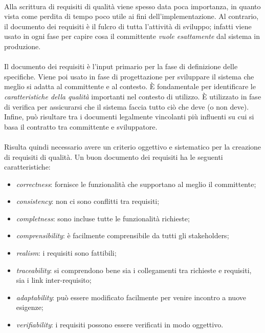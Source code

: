 \documentclass[11pt,a4paper,english]{article}
\begin{document}
\paragraph{} Alla scrittura di requisiti di qualità viene spesso data poca importanza, in quanto vista come perdita di tempo poco utile ai fini dell'implementazione. Al contrario, il documento dei requisiti è il fulcro di tutta l'attività di sviluppo; infatti viene usato in ogni fase per capire cosa il committente \emph{vuole esattamente} dal sistema in produzione. 

\paragraph{} Il documento dei requisiti è l'input primario per la fase di definizione delle specifiche. Viene poi usato in fase di progettazione per sviluppare il sistema che meglio si adatta al committente e al contesto. È fondamentale per identificare le \emph{caratteristiche della qualità} importanti nel contesto di utilizzo. È utilizzato in fase di verifica per assicurarsi che il sistema faccia tutto ciò che deve (o non deve). Infine, può risultare tra i documenti legalmente vincolanti più influenti su cui si basa il contratto tra committente e sviluppatore. 

\paragraph{} Risulta quindi necessario avere un criterio oggettivo e sistematico per la creazione di requisiti di qualità. Un buon documento dei requisiti ha le seguenti caratteristiche:
\begin{itemize}
    \item \emph{correctness}: fornisce le funzionalità che supportano al meglio il committente;
    \item \emph{consistency}: non ci sono conflitti tra requisiti;
    \item \emph{completness}: sono incluse tutte le funzionalità richieste;
    \item \emph{comprensibility}: è facilmente comprensibile da tutti gli stakeholders;
    \item \emph{realism}: i requisiti sono fattibili;
    \item \emph{traceability}: si comprendono bene sia i collegamenti tra richieste e requisiti, sia i link inter-requisito;
    \item \emph{adaptability}: può essere modificato facilmente per venire incontro a nuove esigenze;
    \item \emph{verifiability}: i requisiti possono essere verificati in modo oggettivo.
\end{itemize}
\end{document}
